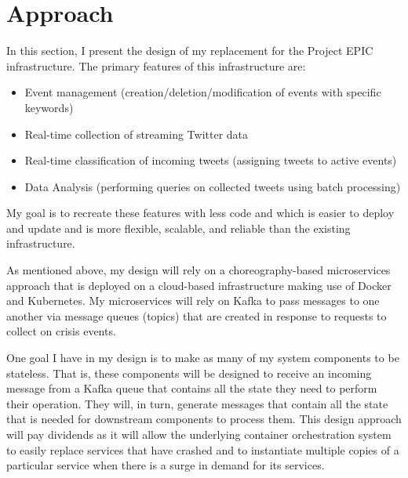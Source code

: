 
\chapter{Approach} %

\label{Chapter4} %

In this section, I present the design of my replacement for the Project EPIC infrastructure. The primary features of this infrastructure are:

\begin{itemize}
	\item Event management (creation/deletion/modification of events with specific keywords)
	\item Real-time collection of streaming Twitter data
	\item Real-time classification of incoming tweets (assigning tweets to active events)
	\item Data Analysis (performing queries on collected tweets using batch processing)
\end{itemize}

My goal is to recreate these features with less code and which is easier to deploy and update and is more flexible, scalable, and reliable than the existing infrastructure.

As mentioned above, my design will rely on a choreography-based microservices approach that is deployed on a cloud-based infrastructure making use of Docker and Kubernetes. My microservices will rely on Kafka to pass messages to one another via message queues (topics) that are created in response to requests to collect on crisis events.

One goal I have in my design is to make as many of my system components to be stateless. That is, these components will be designed to receive an incoming message from a Kafka queue that contains all the state they need to perform their operation. They will, in turn, generate messages that contain all the state that is needed for downstream components to process them. This design approach will pay dividends as it will allow the underlying container orchestration system to easily replace services that have crashed and to instantiate multiple copies of a particular service when there is a surge in demand for its services.

